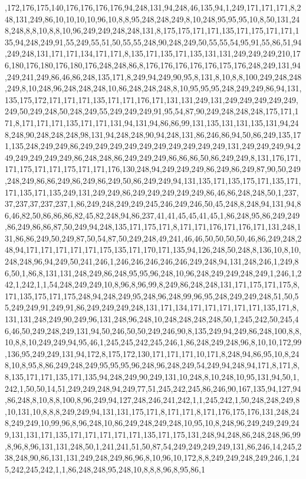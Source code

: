 ,172,176,175,140,176,176,176,176,94,248,131,94,248,46,135,94,1,249,171,171,171,8,248,131,249,86,10,10,10,10,96,10,8,8,95,248,248,249,8,10,248,95,95,95,10,8,50,131,248,248,8,8,10,8,8,10,96,249,249,248,248,131,8,175,175,171,171,135,171,175,171,171,135,94,248,249,91,55,249,55,51,50,55,55,248,90,248,249,50,55,55,54,95,91,55,86,51,94,249,248,131,171,171,134,171,171,8,135,171,135,171,135,131,131,249,249,249,210,176,180,176,180,176,180,176,248,248,86,8,176,176,176,176,176,175,176,248,249,131,94,249,241,249,86,46,86,248,135,171,8,249,94,249,90,95,8,131,8,10,8,8,100,249,248,248,249,8,10,248,96,248,248,248,10,86,248,248,248,8,10,95,95,95,248,249,249,86,94,131,135,175,172,171,171,171,135,171,171,176,171,131,131,249,131,249,249,249,249,249,249,50,249,248,50,248,249,55,249,249,249,91,95,54,87,90,249,248,248,248,175,171,171,8,171,171,171,135,171,171,131,94,131,94,86,86,99,131,135,131,131,135,131,94,248,248,90,248,248,248,98,131,94,248,248,90,94,248,131,86,246,86,94,50,86,249,135,171,135,248,249,249,86,249,249,249,249,249,249,249,249,249,249,131,249,249,249,94,249,249,249,249,249,86,248,248,86,249,249,249,86,86,86,50,86,249,249,8,131,176,171,171,175,171,171,175,171,171,176,130,248,94,249,249,249,86,249,86,249,87,90,50,249,248,249,86,86,249,86,249,86,249,50,86,249,249,94,131,135,171,135,175,171,135,171,171,135,171,135,249,131,249,249,86,249,249,249,249,249,86,46,86,248,248,50,1,237,37,237,37,237,237,1,86,249,248,249,249,245,246,249,246,50,45,248,8,248,94,131,94,86,46,82,50,86,86,86,82,45,82,248,94,86,237,41,41,45,45,41,45,1,86,248,95,86,249,249,86,249,86,86,87,50,249,94,248,135,171,175,171,8,171,171,176,171,176,171,131,248,131,86,86,249,50,249,87,50,54,87,50,249,248,49,241,46,46,50,50,50,50,46,86,249,248,248,94,171,171,171,171,171,175,135,171,170,171,135,94,126,248,50,248,8,136,10,8,10,248,248,96,94,249,50,241,246,1,246,246,246,246,246,249,248,94,131,248,246,1,249,86,50,1,86,8,131,131,248,249,86,248,95,95,96,248,10,96,248,249,249,248,249,1,246,1,242,1,242,1,1,54,248,249,249,10,8,96,8,96,99,8,249,86,248,248,131,171,175,171,175,8,171,135,175,171,175,248,94,248,249,95,248,96,248,99,96,95,248,249,249,248,51,50,55,249,249,91,249,91,86,249,249,249,248,131,171,134,171,171,171,171,171,135,171,8,131,131,248,249,90,249,96,131,248,96,248,10,248,248,248,248,50,1,245,242,50,245,46,46,50,249,248,249,131,94,50,246,50,50,249,246,90,8,135,249,94,249,86,248,100,8,8,10,8,8,10,249,249,94,95,46,1,245,245,242,245,246,1,86,248,249,248,96,8,10,10,172,99,136,95,249,249,131,94,172,8,175,172,130,171,171,171,10,171,8,248,94,86,95,10,8,248,10,8,95,8,86,249,248,249,95,95,95,96,248,96,248,249,54,249,94,248,94,171,8,171,8,8,135,171,171,135,171,135,94,248,249,90,249,131,10,248,8,10,248,10,95,131,94,50,1,242,1,50,50,14,51,249,249,248,94,249,77,51,245,242,245,86,246,90,167,135,94,127,94,86,248,8,10,8,8,100,8,96,249,94,127,248,246,241,242,1,1,245,242,1,50,248,248,249,8,10,131,10,8,8,8,249,249,94,131,131,175,171,8,171,171,8,171,176,175,176,131,248,248,249,249,10,99,96,8,96,248,10,86,249,248,249,248,10,95,10,8,248,96,249,249,249,249,131,131,171,135,171,171,171,171,171,135,171,175,131,248,94,248,86,248,248,96,99,8,96,8,96,131,131,248,50,1,241,241,51,50,87,54,249,249,249,249,131,86,246,14,245,238,248,90,86,131,131,249,248,249,86,96,8,10,96,10,172,8,8,249,249,248,249,246,1,245,242,245,242,1,1,86,248,248,95,248,10,8,8,8,96,8,95,86,1
